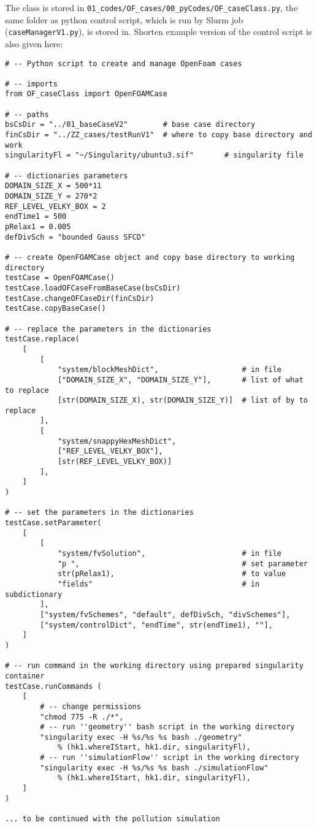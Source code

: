 The class is stored in \texttt{01\_codes/OF\_cases/00\_pyCodes/OF\_caseClass.py}, the same folder as python control script, which is run by Slurm job (\texttt{caseManagerV1.py}), is stored in. Shorten example version of the control script is also given here:
\begin{verbatim}
# -- Python script to create and manage OpenFoam cases

# -- imports 
from OF_caseClass import OpenFOAMCase

# -- paths 
bsCsDir = "../01_baseCaseV2"        # base case directory
finCsDir = "../ZZ_cases/testRunV1"  # where to copy base directory and work
singularityFl = "~/Singularity/ubuntu3.sif"       # singularity file

# -- dictionaries parameters
DOMAIN_SIZE_X = 500*11
DOMAIN_SIZE_Y = 270*2
REF_LEVEL_VELKY_BOX = 2
endTime1 = 500
pRelax1 = 0.005
defDivSch = "bounded Gauss SFCD"

# -- create OpenFOAMCase object and copy base directory to working directory
testCase = OpenFOAMCase()
testCase.loadOFCaseFromBaseCase(bsCsDir)
testCase.changeOFCaseDir(finCsDir)
testCase.copyBaseCase()

# -- replace the parameters in the dictionaries
testCase.replace(
    [
        [
            "system/blockMeshDict",                   # in file
            ["DOMAIN_SIZE_X", "DOMAIN_SIZE_Y"],       # list of what to replace
            [str(DOMAIN_SIZE_X), str(DOMAIN_SIZE_Y)]  # list of by to replace
        ],
        [
            "system/snappyHexMeshDict", 
            ["REF_LEVEL_VELKY_BOX"], 
            [str(REF_LEVEL_VELKY_BOX)]
        ],
    ]
)

# -- set the parameters in the dictionaries 
testCase.setParameter(
    [
        [
            "system/fvSolution",                      # in file 
            "p ",                                     # set parameter
            str(pRelax1),                             # to value
            "fields"                                  # in subdictionary
        ],        
        ["system/fvSchemes", "default", defDivSch, "divSchemes"],
        ["system/controlDict", "endTime", str(endTime1), ""],
    ]
)

# -- run command in the working directory using prepared singularity container
testCase.runCommands (
    [
        # -- change permissions
        "chmod 775 -R ./*",
        # -- run ''geometry'' bash script in the working directory
        "singularity exec -H %s/%s %s bash ./geometry" 
            % (hk1.whereIStart, hk1.dir, singularityFl),
        # -- run ''simulationFlow'' script in the working directory
        "singularity exec -H %s/%s %s bash ./simulationFlow"
            % (hk1.whereIStart, hk1.dir, singularityFl),
    ]
) 

... to be continued with the pollution simulation
\end{verbatim}

